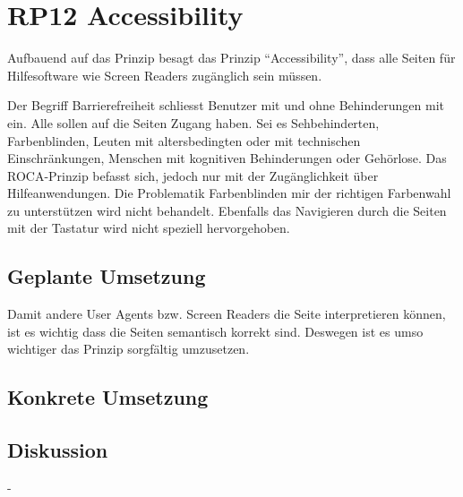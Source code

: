 \section{RP12 Accessibility}
\label{sec:principle-rp12-accessibility}
Aufbauend auf das Prinzip  besagt das Prinzip ``Accessibility'', dass alle Seiten für Hilfesoftware wie Screen Readers zugänglich sein müssen.

Der Begriff Barrierefreiheit schliesst Benutzer mit und ohne Behinderungen mit ein. Alle sollen auf die Seiten Zugang haben. Sei es Sehbehinderten, Farbenblinden, Leuten mit altersbedingten oder mit technischen Einschränkungen, Menschen mit kognitiven Behinderungen oder Gehörlose. Das ROCA-Prinzip befasst sich, jedoch nur mit der Zugänglichkeit über Hilfeanwendungen. Die Problematik Farbenblinden mir der richtigen Farbenwahl zu unterstützen wird nicht behandelt. Ebenfalls das Navigieren durch die Seiten mit der Tastatur wird nicht speziell hervorgehoben.

\subsection*{Geplante Umsetzung}
Damit andere User Agents bzw. Screen Readers die Seite interpretieren können, ist es wichtig dass die Seiten semantisch korrekt sind. Deswegen ist es umso wichtiger das Prinzip  sorgfältig umzusetzen.

\subsection*{Konkrete Umsetzung}


\subsection*{Diskussion}
-
